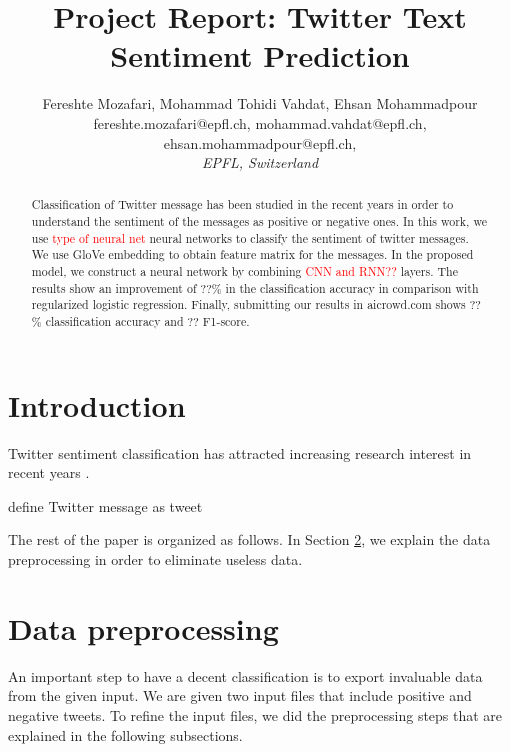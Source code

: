 \documentclass[8pt,conference,compsocconf]{IEEEtran}
\begin{document}
\title{Project Report: Twitter Text Sentiment Prediction}

\author{
 Fereshte Mozafari, Mohammad Tohidi Vahdat, Ehsan Mohammadpour\\
 fereshte.mozafari@epfl.ch, mohammad.vahdat@epfl.ch, ehsan.mohammadpour@epfl.ch, \\
  \textit{EPFL, Switzerland}
}

\maketitle

\begin{abstract}
	Classification of Twitter message has been studied in the recent years in order to understand the sentiment of the messages as positive or negative ones.
	In this work, we use \textcolor{red}{type of neural net} neural networks to classify the sentiment of twitter messages. We use GloVe embedding to obtain feature matrix for the messages. In the proposed model, we construct a neural network by combining \textcolor{red}{CNN and RNN??} layers. The results show an improvement of $??$\% in the classification accuracy in comparison with regularized logistic regression. Finally, submitting our results in aicrowd.com shows $??$\% classification accuracy and $??$ F1-score.
\end{abstract}
\section{Introduction}
Twitter sentiment classification has attracted increasing research interest in recent years \cite{8700266,8924403}.

define Twitter message as tweet
\par 
The rest of the paper is organized as follows. In Section \ref{sec:data}, we explain the data preprocessing in order to eliminate useless data. 


\section{Data preprocessing}\label{sec:data}
An important step to have a decent classification is to export invaluable data from the given input. We are given two input files that include positive and negative tweets. To refine the input files, we did the preprocessing steps that are explained in the following subsections.
\end{document}
